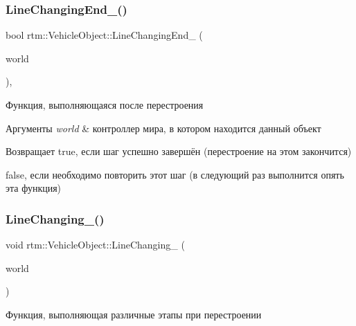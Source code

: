\subsubsection{\texorpdfstring{Line\+Changing\+End\+\_\+()}{LineChangingEnd\_()}}
{\footnotesize\ttfamily bool rtm\+::\+Vehicle\+Object\+::\+Line\+Changing\+End\+\_\+ (\begin{DoxyParamCaption}\item[{\hyperlink{classrtm_1_1_world_controller}{World\+Controller} $\ast$const}]{world }\end{DoxyParamCaption})\hspace{0.3cm}{\ttfamily [protected]}, {\ttfamily [virtual]}}



Функция, выполняющаяся после перестроения 


\begin{DoxyParams}{Аргументы}
{\em world} & контроллер мира, в котором находится данный объект \\
\hline
\end{DoxyParams}
\begin{DoxyReturn}{Возвращает}
true, если шаг успешно завершён (перестроение на этом закончится) 

false, если необходимо повторить этот шаг (в следующий раз выполнится опять эта функция) 
\end{DoxyReturn}
\mbox{\label{classrtm_1_1_vehicle_object_afbfb4168caaa0b61ff8cc18e0b52275c}} 
\subsubsection{\texorpdfstring{Line\+Changing\+\_\+()}{LineChanging\_()}}
{\footnotesize\ttfamily void rtm\+::\+Vehicle\+Object\+::\+Line\+Changing\+\_\+ (\begin{DoxyParamCaption}\item[{\hyperlink{classrtm_1_1_world_controller}{World\+Controller} $\ast$const}]{world }\end{DoxyParamCaption})\hspace{0.3cm}{\ttfamily [private]}}



Функция, выполняющая различные этапы при перестроении 


